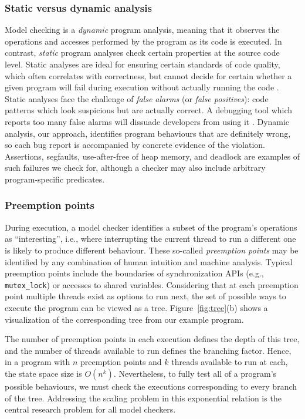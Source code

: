 \subsubsection{Static versus dynamic analysis}

Model checking is a {\em dynamic} program analysis, meaning that it observes the operations and accesses performed by the program as its code is executed.
In contrast, {\em static} program analyses check certain properties at the source code level.
Static analyses are ideal for ensuring certain standards of code quality, which often correlates with correctness,
but cannot decide for certain whether a given program will fail during execution without actually running the code \cite{incompleteness}.
Static analyses face the challenge of {\em false alarms} (or {\em false positives}):
code patterns which look suspicious but are actually correct.
A debugging tool which reports too many false alarms will dissuade developers from using it \cite{racerx}.
Dynamic analysis, our approach, identifies program behaviours that are definitely wrong,
so each bug report is accompanied by concrete evidence of the violation.
Assertions, segfaults, use-after-free of heap memory, and deadlock are examples of such failures we check for,
although a checker may also include arbitrary program-specific predicates.

\subsubsection{Preemption points}

During execution, a model checker identifies a subset of the program's operations as ``interesting'', i.e.,
where interrupting the current thread to run a different one is likely to produce different behaviour.
These so-called {\em preemption points} may be identified by any combination of human intuition and machine analysis.
Typical preemption points include the boundaries of synchronization APIs (e.g., {\tt mutex\_lock}) or accesses to shared variables.
Considering that at each preemption point multiple threads exist as options to run next,
the set of possible ways to execute the program can be viewed as a tree.
Figure~\ref{fig:tree}(b) shows a visualization of the corresponding tree from our example program.

The number of preemption points in each execution defines the depth of this tree,
and the number of threads available to run defines the branching factor.
Hence, in a program with $n$ preemption points and $k$ threads available to run at each, the state space size is $O(n^k)$.
Nevertheless, to fully test all of a program's possible behaviours, we must check the executions corresponding to every branch of the tree.
Addressing the scaling problem in this exponential relation is the central research problem for all model checkers.


